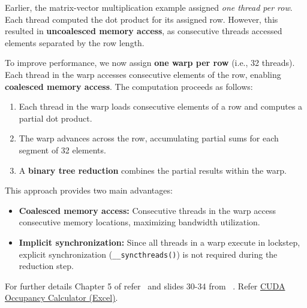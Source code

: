 \documentclass[12pt]{book}
\begin{document}
Earlier, the matrix-vector multiplication example assigned \emph{one thread per row}. Each thread computed the dot product for its assigned row. However, this resulted in \textbf{uncoalesced memory access}, as consecutive threads accessed elements separated by the row length.

To improve performance, we now assign \textbf{one warp per row} (i.e., 32 threads). Each thread in the warp accesses consecutive elements of the row, enabling \textbf{coalesced memory access}. The computation proceeds as follows:

\begin{enumerate}
    \item Each thread in the warp loads consecutive elements of a row and computes a partial dot product.
    \item The warp advances across the row, accumulating partial sums for each segment of 32 elements.
    \item A \textbf{binary tree reduction} combines the partial results within the warp.
\end{enumerate}

This approach provides two main advantages:
\begin{itemize}
    \item \textbf{Coalesced memory access:} Consecutive threads in the warp access consecutive memory locations, maximizing bandwidth utilization.
    \item \textbf{Implicit synchronization:} Since all threads in a warp execute in lockstep, explicit synchronization (\texttt{\_\_syncthreads()}) is not required during the reduction step.
\end{itemize}

For further details Chapter 5 of refer~\cite{nvidia2011nvidia} and slides 30-34 from ~\cite{oster2008advanced}. Refer \href{https://view.officeapps.live.com/op/view.aspx?src=https%3A%2F%2Fcds.iisc.ac.in%2Ffaculty%2Fvss%2Fcourses%2FPPP%2FCUDA_Occupancy_calculator.xls&wdOrigin=BROWSELINK}{CUDA Occupancy Calculator (Excel)}.
\end{document}
